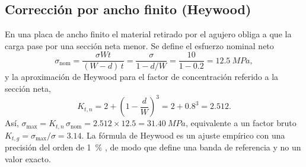 \documentclass[11pt,letterpaper]{article}
\begin{document}
\subsection{Corrección por ancho finito (Heywood)}
En una placa de ancho finito el material retirado por el agujero obliga a que la carga pase por una sección neta menor. Se define el esfuerzo nominal neto
\begin{equation}
\sigma_{\text{nom}}=\frac{\sigma W t}{(W-d)\,t}=\frac{\sigma}{1-d/W}=\frac{10}{1-0.2}=\SI{12.5}{MPa},
\end{equation}
y la aproximación de Heywood para el factor de concentración referido a la sección neta,
\begin{equation}
K_{t,n}=2+\left(1-\frac{d}{W}\right)^3=2+0.8^3=2.512 .
\end{equation}
Así, $\sigma_{\max}=K_{t,n}\,\sigma_{\text{nom}}=2.512\times12.5=\SI{31.40}{MPa}$, equivalente a un factor bruto $K_{t,g}=\sigma_{\max}/\sigma=3.14$. La fórmula de Heywood es un ajuste empírico con una precisión del orden de \SI{1}{\%} \cite{pilkey}, de modo que define una banda de referencia y no un valor exacto.
\end{document}
